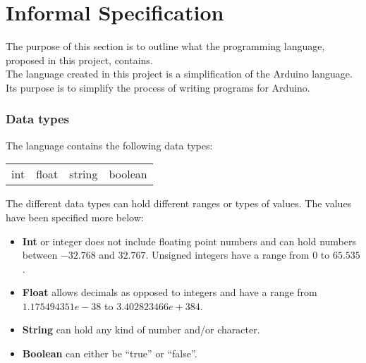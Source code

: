 \chapter{Informal Specification}\label{analysis:informal-specification}
The purpose of this section is to outline what the programming language, proposed in this project, contains.
\\The language created in this project is a simplification of the Arduino language. Its purpose is to simplify the process of writing programs for Arduino.   

\subsection{Data types}
The language contains the following data types: \\ 
\begin{center}
\begin{tabular}{ l l l l}
int & float & string & boolean \\
\end{tabular}
\end{center}

The different data types can hold different ranges or types of values. The values have been specified more below: 
\begin{itemize}
\item \textbf{Int} or integer does not include floating point numbers and can hold numbers between $-32.768$ and $32.767$. Unsigned integers have a range from $0$ to $65.535$. 
\item \textbf{Float} allows decimals as opposed to integers and have a range from $1.175494351e-38$ to $3.402823466e+384$.
\item \textbf{String} can hold any kind of number and/or character. 
\item \textbf{Boolean} can either be ``true'' or ``false''. 
\end{itemize}

